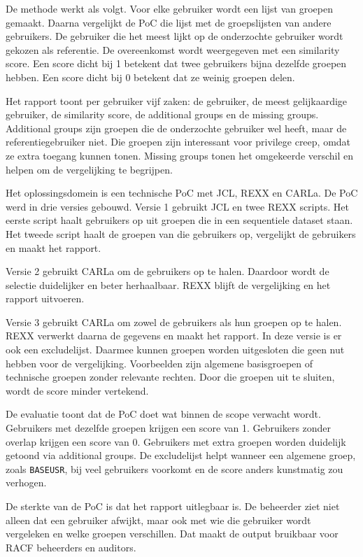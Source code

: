 De methode werkt als volgt. Voor elke gebruiker wordt een lijst van groepen gemaakt. Daarna vergelijkt de PoC die lijst met de groepslijsten van andere gebruikers. De gebruiker die het meest lijkt op de onderzochte gebruiker wordt gekozen als referentie. De overeenkomst wordt weergegeven met een similarity score. Een score dicht bij 1 betekent dat twee gebruikers bijna dezelfde groepen hebben. Een score dicht bij 0 betekent dat ze weinig groepen delen.

Het rapport toont per gebruiker vijf zaken: de gebruiker, de meest gelijkaardige gebruiker, de similarity score, de additional groups en de missing groups. Additional groups zijn groepen die de onderzochte gebruiker wel heeft, maar de referentiegebruiker niet. Die groepen zijn interessant voor privilege creep, omdat ze extra toegang kunnen tonen. Missing groups tonen het omgekeerde verschil en helpen om de vergelijking te begrijpen.

Het oplossingsdomein is een technische PoC met JCL, REXX en CARLa. De PoC werd in drie versies gebouwd. Versie 1 gebruikt JCL en twee REXX scripts. Het eerste script haalt gebruikers op uit groepen die in een sequentiele dataset staan. Het tweede script haalt de groepen van die gebruikers op, vergelijkt de gebruikers en maakt het rapport.

Versie 2 gebruikt CARLa om de gebruikers op te halen. Daardoor wordt de selectie duidelijker en beter herhaalbaar. REXX blijft de vergelijking en het rapport uitvoeren.

Versie 3 gebruikt CARLa om zowel de gebruikers als hun groepen op te halen. REXX verwerkt daarna de gegevens en maakt het rapport. In deze versie is er ook een excludelijst. Daarmee kunnen groepen worden uitgesloten die geen nut hebben voor de vergelijking. Voorbeelden zijn algemene basisgroepen of technische groepen zonder relevante rechten. Door die groepen uit te sluiten, wordt de score minder vertekend.

De evaluatie toont dat de PoC doet wat binnen de scope verwacht wordt. Gebruikers met dezelfde groepen krijgen een score van 1. Gebruikers zonder overlap krijgen een score van 0. Gebruikers met extra groepen worden duidelijk getoond via additional groups. De excludelijst helpt wanneer een algemene groep, zoals \texttt{BASEUSR}, bij veel gebruikers voorkomt en de score anders kunstmatig zou verhogen.

De sterkte van de PoC is dat het rapport uitlegbaar is. De beheerder ziet niet alleen dat een gebruiker afwijkt, maar ook met wie die gebruiker wordt vergeleken en welke groepen verschillen. Dat maakt de output bruikbaar voor RACF beheerders en auditors.

